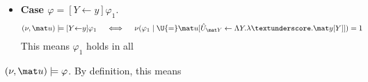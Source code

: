 \begin{subappendices}
{\begin{lproof}
\begin{itemize}
        \item \textbf{Case $\varphi = [Y {\gets}y]\varphi_1$}.
        \begin{align*}
            (\nu, \mat u) \models [Y {\gets}y]\varphi_1
            \quad
            &\iff \quad
            \nu(\varphi_1 \mid \U{=}\mat u[\hat U_{\mat Y} \gets 
                \Lambda Y. \lambda\textunderscore.\mat y[Y]]) = 1
        \end{align*}
        This means $\varphi_1$ holds in all 
        
    \end{itemize}
    
    $(\nu, \mat u) \models \varphi$. 
    By definition, this means   
\end{lproof}
}



% 
% 
% 
% 
% 
% 
% 


% 
% 
% 
% 






\end{subappendices}
